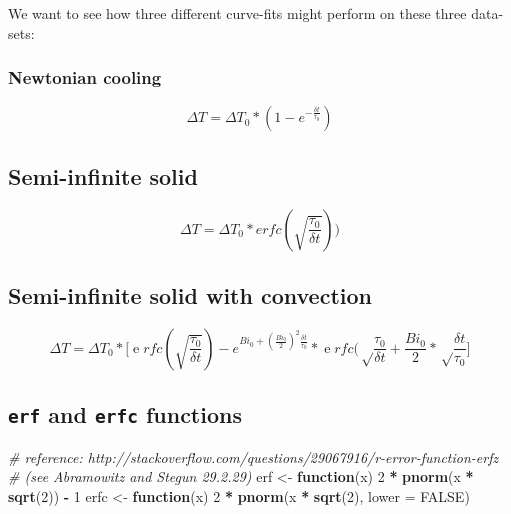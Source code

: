 \documentclass[]{book}
\newenvironment{Shaded}{\begin{snugshade}}{\end{snugshade}}
\newcommand{\CommentTok}[1]{\textcolor[rgb]{0.56,0.35,0.01}{\textit{#1}}}
\newcommand{\ControlFlowTok}[1]{\textcolor[rgb]{0.13,0.29,0.53}{\textbf{#1}}}
\newcommand{\DataTypeTok}[1]{\textcolor[rgb]{0.13,0.29,0.53}{#1}}
\newcommand{\DecValTok}[1]{\textcolor[rgb]{0.00,0.00,0.81}{#1}}
\newcommand{\KeywordTok}[1]{\textcolor[rgb]{0.13,0.29,0.53}{\textbf{#1}}}
\newcommand{\NormalTok}[1]{#1}
\newcommand{\OperatorTok}[1]{\textcolor[rgb]{0.81,0.36,0.00}{\textbf{#1}}}
\newcommand{\OtherTok}[1]{\textcolor[rgb]{0.56,0.35,0.01}{#1}}
\newcommand{\StringTok}[1]{\textcolor[rgb]{0.31,0.60,0.02}{#1}}
\begin{document}
We want to see how three different curve-fits might perform on these three data-sets:

\hypertarget{newtonian-cooling}{%
\subsubsection{Newtonian cooling}\label{newtonian-cooling}}

\[\Delta T = \Delta {T_0} * (1 - e^{-\frac{\delta t}{\tau_0}})\]

\hypertarget{semi-infinite-solid}{%
\subsection{Semi-infinite solid}\label{semi-infinite-solid}}

\[\Delta T = \Delta T_0 * erfc(\sqrt{\frac{\tau_0}{\delta t}}))\]

\hypertarget{semi-infinite-solid-with-convection}{%
\subsection{Semi-infinite solid with convection}\label{semi-infinite-solid-with-convection}}

\[\Delta T = \Delta T_0 * \big [ \operatorname erfc(\sqrt{\frac{\tau_0}{\delta t}}) - e^ {Bi_0 + (\frac {Bi_0}{2})^2 \frac {\delta t}{\tau_0}} * \operatorname erfc (\sqrt \frac{\tau_0}{\delta t} + \frac {Bi_0}{2} * \sqrt \frac{\delta t }{\tau_0} \big]\]

\hypertarget{erf-and-erfc-functions}{%
\subsection{\texorpdfstring{\texttt{erf} and \texttt{erfc} functions}{erf and erfc functions}}\label{erf-and-erfc-functions}}

\begin{Shaded}
\begin{Highlighting}[]
\CommentTok{# reference: http://stackoverflow.com/questions/29067916/r-error-function-erfz}
\CommentTok{# (see Abramowitz and Stegun 29.2.29)}
\NormalTok{erf <-}\StringTok{ }\ControlFlowTok{function}\NormalTok{(x) }\DecValTok{2} \OperatorTok{*}\StringTok{ }\KeywordTok{pnorm}\NormalTok{(x }\OperatorTok{*}\StringTok{ }\KeywordTok{sqrt}\NormalTok{(}\DecValTok{2}\NormalTok{)) }\OperatorTok{-}\StringTok{ }\DecValTok{1}
\NormalTok{erfc <-}\StringTok{ }\ControlFlowTok{function}\NormalTok{(x) }\DecValTok{2} \OperatorTok{*}\StringTok{ }\KeywordTok{pnorm}\NormalTok{(x }\OperatorTok{*}\StringTok{ }\KeywordTok{sqrt}\NormalTok{(}\DecValTok{2}\NormalTok{), }\DataTypeTok{lower =} \OtherTok{FALSE}\NormalTok{)}
\end{Highlighting}
\end{Shaded}
\end{document}
